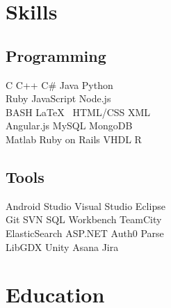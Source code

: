 \documentclass[letterpaper]{deedy-resume}
\begin{document}
\begin{minipage}[t]{0.33\textwidth} %


\section{Skills}

\subsection{Programming}

C \textbullet{} C++ \textbullet{} C\# \textbullet{} Java \textbullet{} Python\\
Ruby \textbullet{} JavaScript \textbullet{} Node.js\\
BASH \textbullet{} \LaTeX\ \textbullet{} HTML/CSS \textbullet{} XML \\

 
Angular.js \textbullet{} MySQL \textbullet{} MongoDB \\
Matlab \textbullet{} Ruby on Rails \textbullet{} VHDL \textbullet{} R \\

\sectionspace %

\subsection{Tools}
Android Studio \textbullet{} Visual Studio \textbullet{} Eclipse \\
Git \textbullet{} SVN \textbullet{} SQL Workbench \textbullet{} TeamCity \\
ElasticSearch \textbullet{} ASP.NET \textbullet{} Auth0 \textbullet{} Parse \\
LibGDX \textbullet{} Unity \textbullet{} Asana \textbullet{} Jira\\

\sectionspace %



\section{Education} 


\end{minipage}
\end{document}
